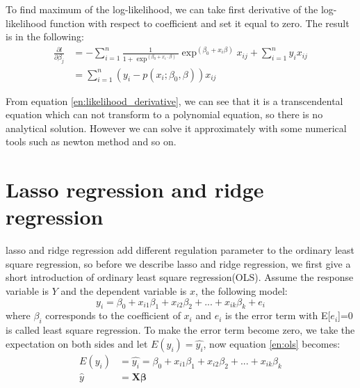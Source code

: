 To find maximum of the log-likelihood, we can take first derivative of the log-likelihood function with respect to coefficient and set it equal to zero. The result is in the following:\\
\begin{equation}\label{en:likelihood_derivative}
\begin{aligned}
\frac{\partial l }{\partial \beta_j}&=-\sum_{i=1}^{n}\frac{1}{1+\exp^{(\beta_0+x_i\cdot \beta)}}\exp^{(\beta_0+x_i\beta)}x_{ij}
+\sum_{i=1}^{n}y_ix_{ij}\\
&=\sum_{i=1}^{n}(y_i-p(x_i;\beta_0,\beta))x_{ij}
\end{aligned}
\end{equation}

From equation \ref{en:likelihood_derivative}, we can see that it is a transcendental equation which can not transform to a polynomial equation, so there is no analytical solution. However we can solve it approximately with some numerical tools such as newton method and so on.   

\section{Lasso regression and ridge regression}
lasso and ridge regression add different regulation parameter to the ordinary least square regression, so before we describe lasso and ridge regression, we first give a short introduction of ordinary least square regression(OLS). Assume the response variable is $Y$ and the dependent variable is $x$, the following model: \\
\begin{equation}\label{en:ols}
y_i=\beta_0+x_{i1}\beta_1 +x_{i2}\beta_2+...+ x_{ik}\beta_k+e_i
\end{equation}
where $\beta_i$ corresponds to the coefficient of $x_i$ and $e_i$ is the error term with E[$e_i$]=0\\
is called least square regression. To make the error term become zero, we take the expectation on both sides and let $E(y_i)=\hat{y_i}$, now equation \ref{en:ols} becomes:
\begin{equation}
\begin{aligned}
E(y_i) &=\hat{y_i}=\beta_0+x_{i1}\beta_1 +x_{i2}\beta_2+...+ x_{ik}\beta_k\\
\hat{y} &={\bm{X\beta}}
\end{aligned}
\end{equation}

